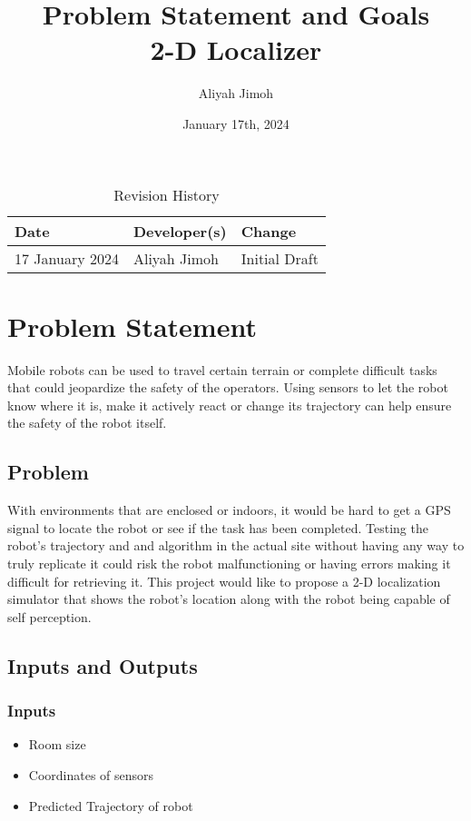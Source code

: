 \documentclass{article}
\title{Problem Statement and Goals\\2-D Localizer}
\author{Aliyah Jimoh}
\date{January 17th, 2024}
\begin{document}
\maketitle

\begin{table}[hp]
\caption{Revision History} \label{TblRevisionHistory}
\begin{tabularx}{\textwidth}{llX}
\toprule
\textbf{Date} & \textbf{Developer(s)} & \textbf{Change}\\
\midrule
17 January 2024 & Aliyah Jimoh & Initial Draft\\

\bottomrule
\end{tabularx}
\end{table}

\section{Problem Statement}
Mobile robots can be used to travel certain terrain or complete difficult tasks that could jeopardize the safety of the operators. Using sensors to let the robot know where it is, make it actively react or change its trajectory can help ensure the safety of the robot itself.
\subsection{Problem}
With environments that are enclosed or indoors, it would be hard to get a GPS signal to locate the robot or see if the task has been completed. Testing the robot's trajectory and and algorithm in the actual site without having any way to truly replicate it could risk the robot malfunctioning or having errors making it difficult for retrieving it. This project would like to propose a 2-D localization simulator that shows the robot's location along with the robot being capable of self perception.

\subsection{Inputs and Outputs}

\subsubsection{Inputs}
\begin{itemize}
    \item Room size  
    \item Coordinates of sensors
    \item Predicted Trajectory of robot
\end{itemize}
\end{document}
